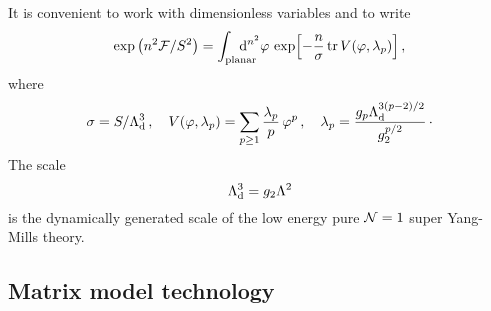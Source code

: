 \documentclass[a4paper,12pt]{article}
\def\tr{\mathop{\rm tr}\nolimits}
\def\d{{\rm d}}
\begin{document}
It is convenient to work with dimensionless variables and to write
%
\begin{equation}
\label{DVint2}
\exp\left( n^{2}\F /S^{2}\right) = \int_{\rm planar}
\hskip -.5cm\d^{n^{2}}\varphi\,
\exp\Bigl[ -{n\over\sigma}\tr V(\varphi,\lambda_{p})\Bigr]\, ,
\end{equation}
%
where
%
\begin{equation}
\label{dimless}
\sigma = S/\Lambda_{\rm d}^{3}\, ,\quad
V(\varphi,\lambda_{p}) = \sum_{p\geq 1} {\lambda_{p}\over p}\, 
\varphi^{p}\, , \quad \lambda_{p} = 
{g_{p}\Lambda_{\rm d}^{3(p-2)/2}\over g_{2}^{p/2}}\,\cdotp
\end{equation}
%
The scale
%
\begin{equation}
\label{Lddef}
\Lambda_{\rm d}^{3} = g_{2}\Lambda^{2}
\end{equation}
%
is the dynamically generated scale of 
the low energy pure ${\cal N}=1$ super Yang-Mills theory.

%
\subsection{Matrix model technology}
%
\end{document}
